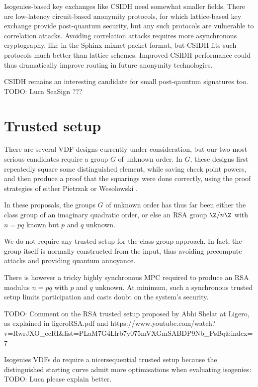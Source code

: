 \documentclass{article}
\begin{document}
Isogenies-based key exchanges like CSIDH need somewhat smaller fields.
There are low-latency circuit-based anonymity protocols, 
for which lattice-based key exchange provide post-quantum security,
but any such protocols are vulnerable to correlation attacks. 
Avoiding correlation attacks requires more asynchronous cryptography,
like in the Sphinx mixnet packet format, but CSIDH fits such protocols
much better than lattice schemes.  Improved CSIDH performance could
thus dramatically improve routing in future anonymity technologies.

CSIDH remains an interesting candidate for small post-qauntum signatures
too.  TODO: Luca SeaSign ???



\section{Trusted setup}

There are several VDF designs currently under consideration, but
our two most serious candidates require a group $G$ of unknown order.
In $G$, these designs first repeatedly square some distinguished
element, while saving check point powers, and then produce a proof
that the squarings were done correctly, using the proof strategies
of either Pietrzak \cite{Pietrzak} or Wesolowski \cite{Wesolowski}.

In these proposals, the groups $G$ of unknown order has thus far been
either the class group of an imaginary quadratic order, or else an
RSA group $\Z/n\Z$ with $n = p q$ known but $p$ and $q$ unknown.

We do not require any trusted setup for the class group approach.
In fact, the group itself is normally constructed from the input,
thus avoiding precompute attacks and providing quantum annoyance.  

There is however a tricky highly synchronous MPC required to produce
an RSA modulus $n = p q$ with $p$ and $q$ unknown.  At minimum, such
a synchronous trusted setup limits participation and casts doubt on
the system's security.  

TODO: Comment on the RSA trusted setup proposed by Abhi Shelat at Ligero, as explained in ligeroRSA.pdf and  https://www.youtube.com/watch?v=RwrJXO_ecRI&list=PLaM7G4Llrb7y075mVXGmSABDP9Nb_PsBq&index=7

Isogenies VDFs do require a nicersequential trusted setup because the
distinguished starting curve admit more optimisations when evaluating
isogenies:
TODO: Luca please explain better.
\end{document}
